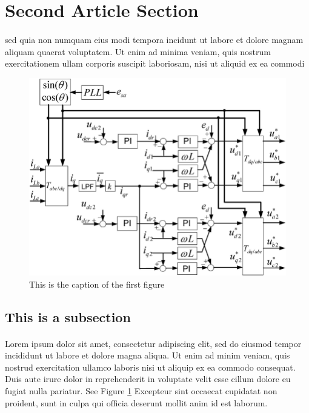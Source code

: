 
\section{Second Article Section}
    \paragraph{}
    sed quia non numquam eius modi tempora incidunt ut labore et dolore magnam aliquam quaerat voluptatem. Ut enim ad minima
    veniam, quis nostrum exercitationem ullam corporis suscipit laboriosam, nisi ut aliquid ex ea commodi

    \begin{figure}[h!]
        \centering
        \includegraphics[scale=0.3]{assets/figures/figure_1.png}
        \caption{This is the caption of the first figure}
        \label{fig:figure of something}
    \end{figure}
    
    \subsection{This is a subsection}
    \paragraph{}
    Lorem ipsum dolor sit amet, consectetur adipiscing elit, sed do eiusmod tempor incididunt ut labore et dolore magna aliqua.
    Ut enim ad minim veniam, quis nostrud exercitation ullamco laboris nisi ut aliquip ex ea commodo consequat. Duis aute irure
    dolor in reprehenderit in voluptate velit esse cillum dolore eu fugiat nulla pariatur. See Figure \ref{fig:figure of something}
    Excepteur sint occaecat cupidatat non proident, sunt in culpa qui officia deserunt mollit anim id est laborum.

